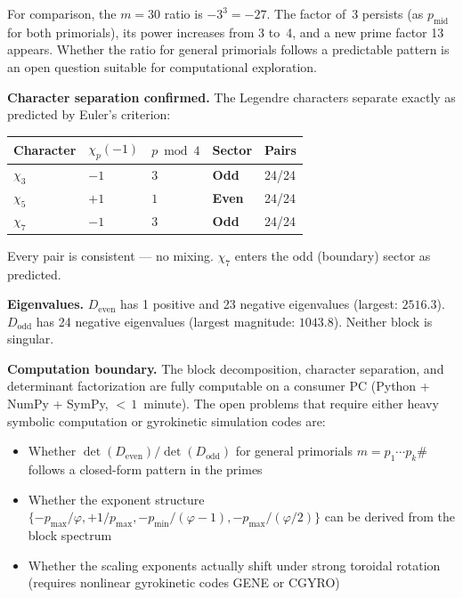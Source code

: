 \documentclass[11pt,letterpaper]{article}
\theoremstyle{definition}
\begin{document}
For comparison, the $m = 30$ ratio is $-3^3 = -27$. The factor of~3 persists (as $p_{\text{mid}}$ for both primorials), its power increases from 3 to~4, and a new prime factor 13 appears. Whether the ratio for general primorials follows a predictable pattern is an open question suitable for computational exploration.

\medskip
\textbf{Character separation confirmed.} The Legendre characters separate exactly as predicted by Euler's criterion:

\begin{center}
\begin{tabular}{@{}lllll@{}}
\toprule
Character & $\chi_p(-1)$ & $p \bmod 4$ & Sector & Pairs \\
\midrule
$\chi_3$ & $-1$ & $3$ & \textbf{Odd}  & 24/24 \\
$\chi_5$ & $+1$ & $1$ & \textbf{Even} & 24/24 \\
$\chi_7$ & $-1$ & $3$ & \textbf{Odd}  & 24/24 \\
\bottomrule
\end{tabular}
\end{center}

Every pair is consistent --- no mixing. $\chi_7$ enters the odd (boundary) sector as predicted.

\textbf{Eigenvalues.} $D_{\text{even}}$ has 1 positive and 23 negative eigenvalues (largest: $2516.3$). $D_{\text{odd}}$ has 24 negative eigenvalues (largest magnitude: $1043.8$). Neither block is singular.

\medskip
\textbf{Computation boundary.} The block decomposition, character separation, and determinant factorization are fully computable on a consumer PC (Python + NumPy + SymPy, ${<}\,1$~minute). The open problems that require either heavy symbolic computation or gyrokinetic simulation codes are:
\begin{itemize}[nosep]
\item Whether $\det(D_{\text{even}})/\det(D_{\text{odd}})$ for general primorials $m = p_1 \cdots p_k\#$ follows a closed-form pattern in the primes
\item Whether the exponent structure $\{-p_{\text{max}}/\varphi, +1/p_{\text{max}}, -p_{\text{min}}/(\varphi-1), -p_{\text{max}}/(\varphi/2)\}$ can be derived from the block spectrum
\item Whether the scaling exponents actually shift under strong toroidal rotation (requires nonlinear gyrokinetic codes GENE or CGYRO)
\end{itemize}
\end{document}
